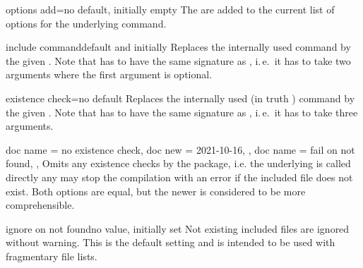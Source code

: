 \documentclass[a4paper,11pt]{ltxdoc}
\begin{document}
\begin{docIgrKey}{options add}{=}{no default, initially empty}
  The  are added to the current list of options
  for the underlying  command.
\end{docIgrKey}


\begin{docIgrKey}{include command}{}{default and initially }
  Replaces the internally used  command by the given .
  Note that  has to have the same signature as ,
  i.\,e.\ it has to take two arguments where the first argument is optional.
\end{docIgrKey}

\begin{docIgrKey}{existence check}{=}{no default}
  Replaces the internally used 
  (in truth )
  command by the given .
  Note that  has to have the same signature as ,
  i.\,e.\ it has to take three arguments.
\end{docIgrKey}

\begin{docIgrKeys}[
    doc parameter   = {},
    doc description = {no value}
  ]
  {
    {
      doc name = no existence check,
      doc new  = 2021-10-16,
    },
    {
      doc name = fail on not found,
    },
  }
  Omits any existence checks by the package, i.e. the underlying
   is called directly any may
  stop the compilation with an error if the included file does not exist.
  Both options are equal, but the newer 
  is considered to be more comprehensible.
\end{docIgrKeys}

\begin{docIgrKey}{ignore on not found}{}{no value, initially set}
  Not existing included files are ignored without warning. This is the default
  setting and is intended to be used with fragmentary file lists.
\end{docIgrKey}

\clearpage
\end{document}
